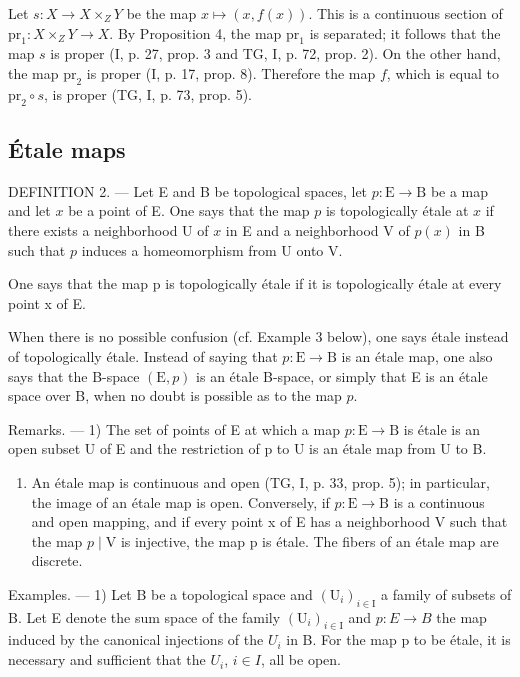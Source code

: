 Let \(s \colon X \to X \times_{Z} Y\) be the map \(x \mapsto (x, f(x))\). This is a continuous section of \(\mathrm{pr}_1 \colon X \times_{Z} Y \to X\). By Proposition 4, the map \(\mathrm{pr}_1\) is separated; it follows that the map \(s\) is proper (I, p. 27, prop. 3 and TG, I, p. 72, prop. 2). On the other hand, the map \(\mathrm{pr}_2\) is proper (I, p. 17, prop. 8). Therefore the map \(f\), which is equal to \(\mathrm{pr}_2 \circ s\), is proper (TG, I, p. 73, prop. 5).

\subsection{Étale maps}

DEFINITION 2. --- Let E and B be topological spaces, let \(p\colon\mathrm{E}\to\mathrm{B}\) be a map and let \(x\) be a point of E. One says that the map \(p\) is topologically étale at \(x\) if there exists a neighborhood U of \(x\) in E and a neighborhood V of \(p(x)\) in B such that \(p\) induces a homeomorphism from U onto V.

One says that the map p is topologically étale if it is topologically étale at every point x of E.

When there is no possible confusion (cf. Example 3 below), one says étale instead of topologically étale. Instead of saying that \(p\colon \mathrm{E}\to \mathrm{B}\) is an étale map, one also says that the B-space \((\mathrm{E},p)\) is an étale B-space, or simply that E is an étale space over B, when no doubt is possible as to the map \(p\).

Remarks. --- 1) The set of points of E at which a map \(p \colon \mathrm{E} \to \mathrm{B}\) is étale is an open subset U of E and the restriction of p to U is an étale map from U to B.

\begin{enumerate}
\def\labelenumi{\arabic{enumi})}
\setcounter{enumi}{1}
\tightlist
\item
  An étale map is continuous and open (TG, I, p. 33, prop. 5); in particular, the image of an étale map is open. Conversely, if \(p \colon \mathrm{E} \to \mathrm{B}\) is a continuous and open mapping, and if every point x of E has a neighborhood V such that the map \(p \mid \mathrm{V}\) is injective, the map p is étale. The fibers of an étale map are discrete.
\end{enumerate}

Examples. --- 1) Let B be a topological space and \((\mathrm{U}_{i})_{i\in\mathrm{I}}\) a family of subsets of B. Let E denote the sum space of the family \((\mathrm{U}_{i})_{i\in\mathrm{I}}\) and \(p: E \to B\) the map induced by the canonical injections of the \(U_{i}\) in B. For the map p to be étale, it is necessary and sufficient that the \(U_{i}\), \(i \in I\), all be open.

